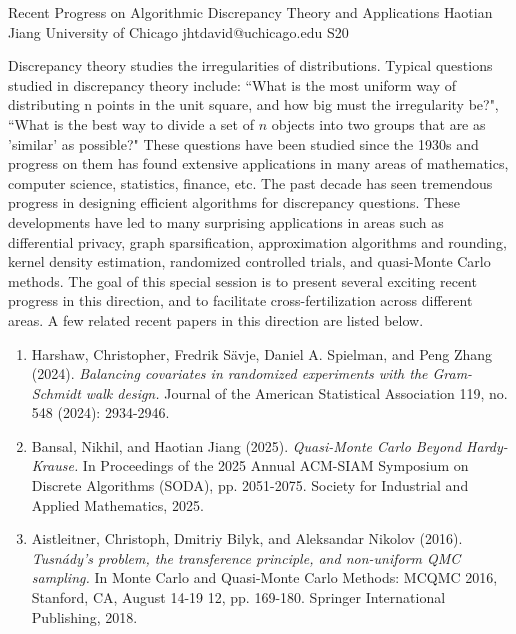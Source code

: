 \documentclass[12pt,lettersize,oneside]{book} %
\begin{document}
\begin{session}
 {Recent Progress on Algorithmic Discrepancy Theory and Applications}%
 {Haotian Jiang}%
 {University of Chicago}%
 {jhtdavid@uchicago.edu}%
{}{}{}
 {S20}%
{}

 Discrepancy theory studies the irregularities of distributions. Typical questions studied in discrepancy theory include: ``What is the most uniform way of distributing n points in the unit square, and how big must the irregularity be?", ``What is the best way to divide a set of $n$ objects into two groups that are as 'similar' as possible?" These questions have been studied since the 1930s and progress on them has found extensive applications in many areas of mathematics, computer science, statistics, finance, etc.
 The past decade has seen tremendous progress in designing efficient algorithms for discrepancy questions. These developments have led to many surprising applications in areas such as differential privacy, graph sparsification, approximation algorithms and rounding, kernel density estimation, randomized controlled trials, and quasi-Monte Carlo methods.
 The goal of this special session is to present several exciting recent progress in this direction, and to facilitate cross-fertilization across different areas.
 \medskip
 A few related recent papers in this direction are listed below.
 \begin{enumerate}
 \item [{[1]}] Harshaw, Christopher, Fredrik S\"avje, Daniel A. Spielman, and Peng Zhang (2024). {\it Balancing covariates in randomized experiments with the Gram-Schmidt walk design.} Journal of the American Statistical Association 119, no. 548 (2024): 2934-2946.
 \item[{[2]}] Bansal, Nikhil, and Haotian Jiang (2025). {\it Quasi-Monte Carlo Beyond Hardy-Krause.} In Proceedings of the 2025 Annual ACM-SIAM Symposium on Discrete Algorithms (SODA), pp. 2051-2075. Society for Industrial and Applied Mathematics, 2025.
 \item [{[3]}] Aistleitner, Christoph, Dmitriy Bilyk, and Aleksandar Nikolov (2016). {\it Tusn\'ady’s problem, the transference principle, and non-uniform QMC sampling.} In Monte Carlo and Quasi-Monte Carlo Methods: MCQMC 2016, Stanford, CA, August 14-19 12, pp. 169-180. Springer International Publishing, 2018.
 \end{enumerate}
\end{session}
\end{document}
